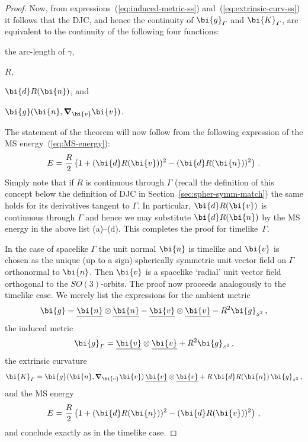 \documentclass
[rmp,aps,twocolumn,showpacs,preprintnumbers,amsmath,amssymb]{revtex4}
\theoremstyle{plain}
\theoremstyle{definition}
\theoremstyle{remark}
\newcommand{\ul}[1]{\underline{#1}}
\newcommand{\sss}{\scriptscriptstyle}
\newcommand{\bnabla}{\boldsymbol{\nabla}}     %
\newcommand{\ed}{\bi{d}}                      %
\newcommand{\Stwo}{{S^2}}                         %
\newcommand{\sStwo}{{\sss \Stwo}}                 %
\newcommand{\gG}{\g_\varGamma}                    %
\newcommand{\gStwo}{\g_\sStwo}                    %
\newcommand{\g}{\bg}                            %
\newcommand{\bg}{\bi{g}}
\newcommand{\bn}{\bi{n}}
\newcommand{\bv}{\bi{v}}
\newcommand{\bK}{\bi{K}}
\begin{document}
\begin{proof}
Now, from expressions~(\ref{eq:induced-metric-ss}) 
and~(\ref{eq:extrinsic-curv-ss}) it follows that the DJC, and 
hence the continuity of $\gG$ and $\bK_\varGamma$, are equivalent 
to the continuity of the following four functions: 
%
\begin{compactenum}[\hspace{3ex} (a)]
\item the arc-length of $\gamma$, 
\item $R$, 
\item $\ed R(\bn)$, and 
\item $\g(\bn,\bnabla_\bv\bv)$.
\end{compactenum}
%
The statement of the theorem will now follow from the following 
expression of the MS energy~(\ref{eq:MS-energy}):
%
\begin{equation}\label{eq:MS-energy-ss}
  E = \frac{R}{2} \left( 1 + (\ed R(\bv))^2 - (\ed R(\bn))^2 \right)\,.
\end{equation}
%
Simply note that if $R$ is continuous through $\varGamma$ (recall the 
definition of this concept below the definition of DJC in 
Section~\ref{sec:spher-symm-match}) the same holds for its 
derivatives tangent to $\varGamma$. In particular, $\ed R(\bv)$ 
is continuous through $\varGamma$ and hence we may substitute 
$\ed R(\bn)$ by the MS energy in the above list (a)--(d). 
This completes the proof for timelike~$\varGamma$.

In the case of spacelike $\varGamma$ the unit normal $\bn$ is 
timelike and $\bv$ is chosen as the unique (up to a sign) 
spherically symmetric unit vector field on $\varGamma$ 
orthonormal to $\bn$. Then $\bv$ is a spacelike `radial' 
unit vector field orthogonal to the $SO(3)$-orbits.
The proof now proceeds analogously to the timelike case.
We merely list the expressions for the ambient metric
%
\begin{equation*}
  \g = \ul\bn\otimes\ul\bn - \ul\bv\otimes\ul\bv - R^2 \gStwo \,,
\end{equation*}
%
the induced metric 
%
\begin{equation}\label{eq:induced-metric-ss-spacelike-case}
  \gG = \ul\bv\otimes\ul\bv + R^2 \gStwo \,,
\end{equation}
%
the extrinsic curvature
%
\begin{equation}\label{eq:extrinsic-curv-ss-spacelike-case}
  \bK_\varGamma = \g(\bn,\bnabla_\bv\bv)\,\ul\bv\otimes\ul\bv 
                  + R\,\ed R(\bn)\,\gStwo \,,
\end{equation}
%
and the MS energy
%
\begin{equation}\label{eq:MS-energy-ss-spacelike-case}
  E = \frac{R}{2} \left( 1 + (\ed R(\bn))^2 - (\ed R(\bv))^2 \right) \,,
\end{equation}
%
and conclude exactly as in the timelike case.
\end{proof}
%
\end{document}
